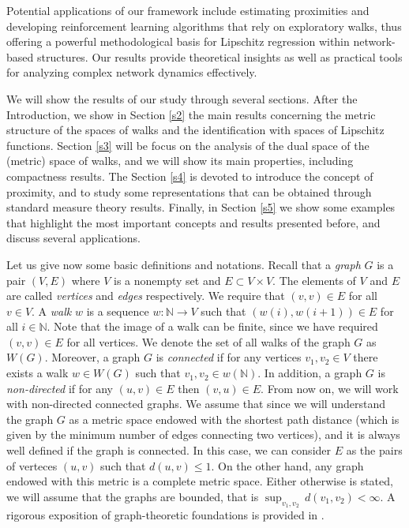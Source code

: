 \documentclass[preprint,12pt]{elsarticle}
\begin{document}
Potential applications of our framework include estimating proximities and developing reinforcement learning algorithms that rely on exploratory walks, thus offering a powerful methodological basis for Lipschitz regression within network-based structures. Our results provide theoretical insights as well as practical tools for analyzing complex network dynamics effectively.


We will show the results of our study through several sections. After the Introduction, we show in Section \ref{s2} the main results concerning the metric structure of the spaces of walks and the identification with spaces of Lipschitz functions. Section \ref{s3} will be focus on the analysis of the dual space of the (metric) space of walks, and we will show its main properties, including compactness results. The Section \ref{s4} is devoted to introduce the concept of proximity, and to study some representations that can be obtained through standard measure theory results. Finally, 
in Section \ref{s5} 
we show some examples that highlight the most important concepts and results presented before, and discuss several applications. 

Let us give now some basic definitions and notations. 
Recall that a \emph{graph} $G$ is a pair $(V,E)$ where $V$ is a nonempty set and $E\subset V\times V$. The elements of $V$ and $E$ are called \emph{vertices} and \emph{edges} respectively. We require that $(v,v)\in E$ for all $v\in V$. A \emph{walk} $w$ is a sequence $w\colon\mathbb N\to V$ such that $(w(i),w(i+1))\in E$ for all $i\in\mathbb N$. Note that the image of a walk can be finite, since we have required $(v,v)\in E$ for all vertices. We denote the set of all walks of the graph $G$ as $W(G)$. Moreover, a graph $G$ is \emph{connected} if for any vertices $v_1,v_2\in V$ there exists a walk $w\in W(G)$ such that $v_1,v_2\in w(\mathbb N)$. In addition, a graph $G$ is \emph{non-directed} if for any $(u,v)\in E$ then $(v,u)\in E$. From now on, we will work with non-directed connected graphs. We assume that since we will understand the graph $G$ as a metric space endowed with the shortest path distance (which is given by the minimum number of edges connecting two vertices), and it is always well defined if the graph is connected. In this case, we can consider $E$ as the pairs of verteces $(u,v)$ such that $d(u,v)\leq 1$. On the other hand, any graph endowed with this metric is a complete metric space. Either otherwise is stated, we will assume that the graphs are bounded, that is $\sup_{v_1,v_2} \, d(v_1,v_2) < \infty.$
 A rigorous exposition of graph-theoretic foundations is provided in \cite{bondy}.
\end{document}
